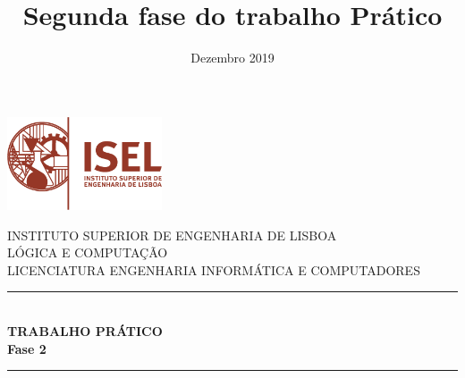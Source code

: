 \documentclass[11pt]{report}
\title{Segunda fase do trabalho Prático}
\date{Dezembro 2019}
\begin{document}

\begin{titlepage} 

\newcommand{\HRule}{\rule{\linewidth}{0.5mm}} %


\includegraphics[width=130pt, keepaspectratio=true]{img/logo_isel}\\[1cm] %
\center %
 

\textsc{\LARGE INSTITUTO SUPERIOR DE ENGENHARIA DE LISBOA}\\[1.5cm] %
\vskip 40pt
\textsc{\Large LÓGICA E COMPUTAÇÃO}\\[0.5cm] %
\textsc{\large LICENCIATURA ENGENHARIA INFORMÁTICA E COMPUTADORES}\\[0.5cm] %
\vskip 40pt


\HRule \\[0.4cm]
{ \LARGE \bfseries TRABALHO PRÁTICO }\\[0.4cm]
{ \huge \bfseries Fase 2}\\[0.4cm] %
\HRule \\[1.5cm]
 

\end{titlepage}
\end{document}
